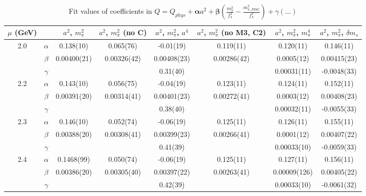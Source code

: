 \documentclass[12pt]{extarticle}
\begin{document}
\begin{table}[h!]
\begin{center}
\begin{tabular}{|c c|c|c|c|c|c|c|}
\hline
$\mu$ (GeV) &  & $a^2$, $m_\pi^2$& $a^2$, $m_\pi^2$ (no C)& $a^2$, $m_\pi^2$, $a^4$& $a^2$, $m_\pi^2$ (no M3, C2)& $a^2$, $m_\pi^2$, $m_\pi^4$& $a^2$, $m_\pi^2$, $\delta m_s$\\
\hline
\multirow{3}{0.5in}{2.0} & $\alpha$ & 0.138(10)& 0.065(76)& -0.01(19)& 0.119(11)& 0.120(11)& 0.146(11)\\
 & $\beta$ & 0.00400(21)& 0.00326(42)& 0.00408(23)& 0.00286(42)& 0.0005(12)& 0.00415(23)\\
 & $\gamma$ &  &  & 0.31(40)&  & 0.00031(11)& -0.0048(33)\\
\hline
\multirow{3}{0.5in}{2.2} & $\alpha$ & 0.143(10)& 0.056(75)& -0.04(19)& 0.123(11)& 0.124(11)& 0.152(11)\\
 & $\beta$ & 0.00391(20)& 0.00314(41)& 0.00401(23)& 0.00272(41)& 0.0003(12)& 0.00408(23)\\
 & $\gamma$ &  &  & 0.38(40)&  & 0.00032(11)& -0.0055(33)\\
\hline
\multirow{3}{0.5in}{2.3} & $\alpha$ & 0.146(10)& 0.052(74)& -0.06(19)& 0.125(11)& 0.126(11)& 0.155(11)\\
 & $\beta$ & 0.00388(20)& 0.00308(41)& 0.00399(23)& 0.00266(41)& 0.0001(12)& 0.00407(22)\\
 & $\gamma$ &  &  & 0.41(39)&  & 0.00033(10)& -0.0059(33)\\
\hline
\multirow{3}{0.5in}{2.4} & $\alpha$ & 0.1468(99)& 0.050(74)& -0.06(19)& 0.125(11)& 0.127(11)& 0.156(11)\\
 & $\beta$ & 0.00386(20)& 0.00305(40)& 0.00397(22)& 0.00263(41)& 0.00009(126)& 0.00405(22)\\
 & $\gamma$ &  &  & 0.42(39)&  & 0.00033(10)& -0.0061(32)\\
\hline
\end{tabular}
\caption{Fit values of coefficients in $Q = Q_{phys} + \mathbf{\alpha} a^2 + \mathbf{\beta}\left(\frac{m_\pi^2}{f_\pi^2}-\frac{m_{\pi,PDG}^2}{f_\pi^2}\right) + \gamma(\ldots)$}
\end{center}
\end{table}






\end{document}
